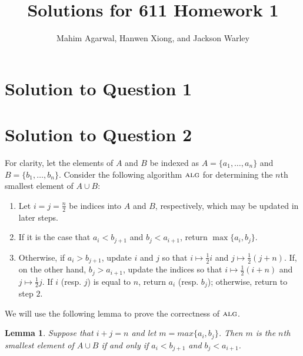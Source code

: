 \documentclass[11pt]{article}
\title{Solutions for 611 Homework 1}
\author{Mahim Agarwal, Hanwen Xiong, and Jackson Warley}
\newcommand{\alg}{\textsc{alg}}
\newtheorem{lemma}[theorem]{Lemma}
\begin{document}
\maketitle

\section{Solution to Question 1}



\section{Solution to Question 2}

For clarity, let the elements of $A$ and $B$ be indexed as $A = \{a_1, \dots, a_n\}$ and $B = \{b_1, \dots, b_n\}$.
Consider the following algorithm $\alg$ for determining the $n$th smallest element of $A \cup B$:
\begin{enumerate}
  \item Let $i = j = \frac{n}{2}$ be indices into $A$ and $B$, respectively, which may be updated in later steps.
  \item If it is the case that $a_i < b_{j+1}$ and $b_j < a_{i+1}$, return $\max \{a_i, b_j\}$.
  \item Otherwise, if $a_i > b_{j+1}$, update $i$ and $j$ so that $i \mapsto \frac{1}{2}i$ and $j \mapsto \frac{1}{2}(j + n)$.
    If, on the other hand, $b_j > a_{i+1}$, update the indices so that $i \mapsto \frac{1}{2}(i + n)$ and $j \mapsto \frac{1}{2}j$.
    If $i$ (resp. $j$) is equal to $n$, return $a_i$ (resp. $b_j$); otherwise, return to step $2$.
\end{enumerate}
We will use the following lemma to prove the correctness of $\alg$.

\begin{lemma}
  \label{nth-smallest-lemma}
  Suppose that $i + j = n$ and let $m = max \{a_i, b_j\}$. Then $m$ is the $n$th smallest element of $A \cup B$ if and only if $a_i < b_{j+1}$ and $b_j < a_{i+1}$.
\end{lemma}
\end{document}
